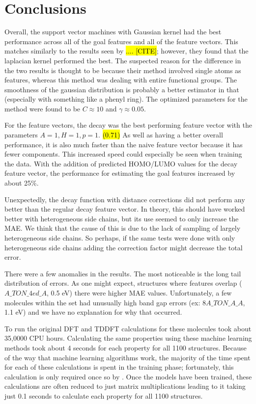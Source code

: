 \documentclass[10pt]{article}
\begin{document}
\section{Conclusions}

Overall, the support vector machines with Gaussian kernel had the best performance across all of the goal features and all of the feature vectors. This matches similarly to the results seen by \hl{.... [CITE]}; however, they found that the laplacian kernel performed the best. The suspected reason for the difference in the two results is thought to be because their method involved single atoms as features, whereas this method was dealing with entire functional groups. The smoothness of the gaussian distribution is probably a better estimator in that (especially with something like a phenyl ring). The optimized parameters for the method were found to be $C \approx 10$ and $\gamma \approx 0.05$.

For the feature vectors, the decay was the best performing feature vector with the parameters $A = 1, H = 1, p = 1$. \hl{(0.71)} As well as having a better overall performance, it is also much faster than the naive feature vector because it has fewer components. This increased speed could especially be seen when training the data.
With the addition of predicted HOMO/LUMO values for the decay feature vector, the performance for estimating the goal features increased by about 25\%.

Unexpectedly, the decay function with distance corrections did not perform any better than the regular decay feature vector. In theory, this should have worked better with heterogeneous side chains, but its use seemed to only increase the MAE. We think that the cause of this is due to the lack of sampling of largely heterogeneous side chains. So perhaps, if the same tests were done with only heterogeneous side chains adding the correction factor might decrease the total error.

There were a few anomalies in the results. The most noticeable is the long tail distribution of errors. As one might expect, structures where features overlap ($A\_TON\_4ed\_A$, 0.5 eV) there were higher MAE values. Unfortunately, a few molecules within the set had unusually high band gap errors (ex: $8A\_TON\_A\_A$, 1.1 eV) and we have no explanation for why that occurred.

To run the original DFT and TDDFT calculations for these molecules took about 35,0000 CPU hours. Calculating the same properties using these machine learning methods took about 4 seconds for each property for all 1100 structures. Because of the way that machine learning algorithms work, the majority of the time spent for each of these calculations is spent in the training phase; fortunately, this calculation is only required once so by . Once the models have been trained, these calculations are often reduced to just matrix multiplications leading to it taking just 0.1 seconds to calculate each property for all 1100 structures.
\end{document}

